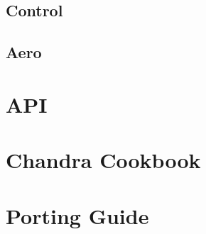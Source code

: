 \documentclass[12pt,a4paper,article]{memoir} %
\begin{document}
\section{Control}
\section{Aero}

\chapter{API}
\section{}
\subsection{}

\chapter{Chandra Cookbook}
\section{}
\subsection{}

\chapter{Porting Guide}
\end{document}
